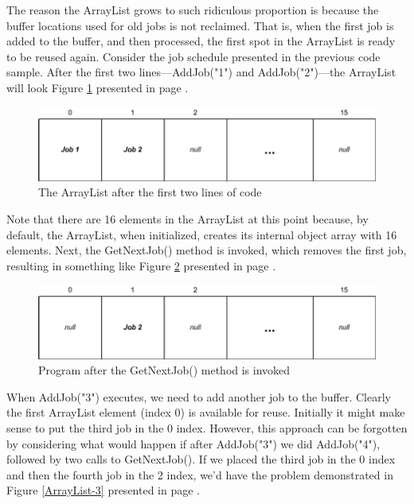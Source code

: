 \documentclass[12pt,a4paper,final,twoside,titlepage]{book}
\begin{document}
The reason the ArrayList grows to such ridiculous proportion is because the buffer locations used for old jobs is not reclaimed. That is, when the first job is added to the buffer, and then processed, the first spot in the ArrayList is ready to be reused again. Consider the job schedule presented in the previous code sample. After the first two lines—AddJob("1") and AddJob("2")—the ArrayList will look Figure \ref{ArrayList-1} presented in page \pageref{ArrayList-1}.
\begin{figure}
\begin{center}
\includegraphics[scale=0.75]{ArrayList-1}
\caption{The ArrayList after the first two lines of code}
\label{ArrayList-1}
\end{center}
\end{figure}
Note that there are 16 elements in the ArrayList at this point because, by default, the ArrayList, when initialized, creates its internal object array with 16 elements. Next, the GetNextJob() method is invoked, which removes the first job, resulting in something like Figure \ref{ArrayList-2} presented in page \pageref{ArrayList-2}.
\begin{figure}
\begin{center}
\includegraphics[scale=0.75]{ArrayList-2}
\caption{Program after the GetNextJob() method is invoked}
\label{ArrayList-2}
\end{center}
\end{figure}
When AddJob("3") executes, we need to add another job to the buffer. Clearly the first ArrayList element (index 0) is available for reuse. Initially it might make sense to put the third job in the 0 index. However, this approach can be forgotten by considering what would happen if after AddJob("3") we did AddJob("4"), followed by two calls to GetNextJob(). If we placed the third job in the 0 index and then the fourth job in the 2 index, we'd have the problem demonstrated in Figure \ref{ArrayList-3} presented in page \pageref{ArrayList-3}.
\end{document}

